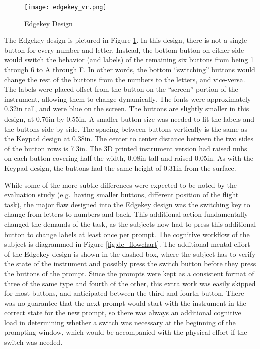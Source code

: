 \begin{figure}
    \centering
    \texttt{[image: edgekey\_vr.png]}
    \caption{Edgekey Design}
    \label{fig:de_edgekey_design}
\end{figure}

The Edgekey design is pictured in Figure \ref{fig:de_edgekey_design}.
In this design, there is not a single button for every number and letter.
Instead, the bottom button on either side would switch the behavior (and labels) of the remaining six buttons from being 1 through 6 to A through F.
In other words, the bottom ``switching'' buttons would change the rest of the buttons from the numbers to the letters, and vice-versa.
The labels were placed offset from the button on the ``screen'' portion of the instrument, allowing them to change dynamically.
The fonts were approximately 0.32in tall, and were blue on the screen.
The buttons are slightly smaller in this design, at 0.76in by 0.55in.
A smaller button size was needed to fit the labels and the buttons side by side.
The spacing between buttons vertically is the same as the Keypad design at 0.38in.
The center to center distance between the two sides of the button rows is 7.3in.
The 3D printed instrument version had raised nubs on each button covering half the width, 0.08in tall and raised 0.05in.
As with the Keypad design, the buttons had the same height of 0.31in from the surface.

While some of the more subtle differences were expected to be noted by the evaluation study (e.g.\ having smaller buttons, different position of the flight task), the major flaw designed into the Edgekey design was the switching key to change from letters to numbers and back.
This additional action fundamentally changed the demands of the task, as the subjects now had to press this additional button to change labels at least once per prompt.
The cognitive workflow of the subject is diagrammed in Figure \ref{fig:de_flowchart}.
The additional mental effort of the Edgekey design is shown in the dashed box, where the subject has to verify the state of the instrument and possibly press the switch button before they press the buttons of the prompt.
Since the prompts were kept as a consistent format of three of the same type and fourth of the other, this extra work was easily skipped for most buttons, and anticipated between the third and fourth button.
There was no guarantee that the next prompt would start with the instrument in the correct state for the new prompt, so there was always an additional cognitive load in determining whether a switch was necessary at the beginning of the prompting window, which would be accompanied with the physical effort if the switch was needed.

